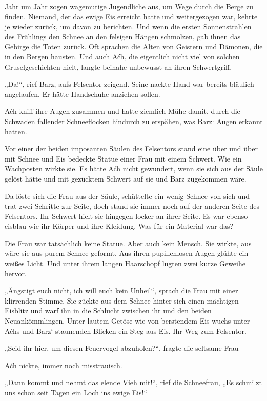 Jahr um Jahr zogen wagemutige Jugendliche aus, um Wege durch die Berge zu finden. Niemand, der das ewige Eis erreicht hatte und weitergezogen war, kehrte je wieder zurück, um davon zu berichten. Und wenn die ersten Sonnenstrahlen des Frühlings den Schnee an den felsigen Hängen schmolzen, gab ihnen das Gebirge die Toten zurück. Oft sprachen die Alten von Geistern und Dämonen, die in den Bergen hausten. Und auch Aćh, die eigentlich nicht viel von solchen Gruselgeschichten hielt, langte beinahe unbewusst an ihren Schwertgriff.

„Da!“, rief Barz, aufs Felsentor zeigend. Seine nackte Hand war bereits bläulich angelaufen. Er hätte Handschuhe anziehen sollen.

Aćh kniff ihre Augen zusammen und hatte ziemlich Mühe damit, durch die Schwaden fallender Schneeflocken hindurch zu erspähen, was Barz‘ Augen erkannt hatten.

Vor einer der beiden imposanten Säulen des Felsentors stand eine über und über mit Schnee und Eis bedeckte Statue einer Frau mit einem Schwert. Wie ein Wachposten wirkte sie. Es hätte Aćh nicht gewundert, wenn sie sich aus der Säule gelöst hätte und mit gezücktem Schwert auf sie und Barz zugekommen wäre.

Da löste sich die Frau aus der Säule, schüttelte ein wenig Schnee von sich und trat zwei Schritte zur Seite, doch stand sie immer noch auf der anderen Seite des Felsentors. Ihr Schwert hielt sie hingegen locker an ihrer Seite. Es war ebenso eisblau wie ihr Körper und ihre Kleidung. Was für ein Material war das?

Die Frau war tatsächlich keine Statue. Aber auch kein Mensch. Sie wirkte, aus wäre sie aus purem Schnee geformt. Aus ihren pupillenlosen Augen glühte ein weißes Licht. Und unter ihrem langen Haarschopf lugten zwei kurze Geweihe hervor.

„Ängstigt euch nicht, ich will euch kein Unheil“, sprach die Frau mit einer klirrenden Stimme. Sie zückte aus dem Schnee hinter sich einen mächtigen Eisblitz und warf ihn in die Schlucht zwischen ihr und den beiden Neuankömmlingen. Unter lautem Getöse wie von berstendem Eis wuchs unter Aćhs und Barz‘ staunenden Blicken ein Steg aus Eis. Ihr Weg zum Felsentor.

„Seid ihr hier, um diesen Feuervogel abzuholen?“, fragte die seltsame Frau

Aćh nickte, immer noch misstrauisch.

„Dann kommt und nehmt das elende Vieh mit!“, rief die Schneefrau, „Es schmilzt uns schon seit Tagen ein Loch ins ewige Eis!“

